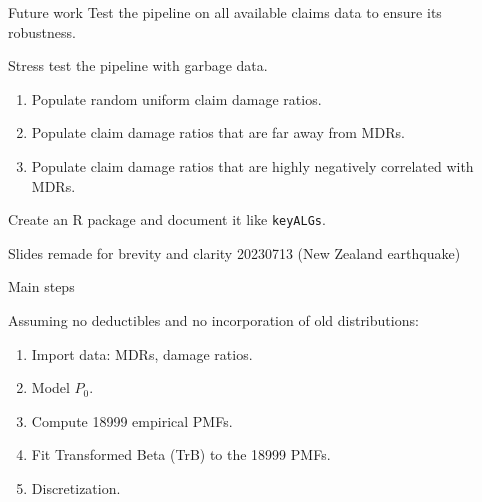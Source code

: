 \documentclass[aspectratio=169]{beamer}
\begin{document}
\begin{frame}{Future work}
Test the pipeline on all available claims data to ensure its robustness.\medskip

Stress test the pipeline with garbage data.\medskip

\begin{enumerate}
\item Populate random uniform claim damage ratios.\medskip

\item Populate claim damage ratios that are far away from MDRs.\medskip

\item Populate claim damage ratios that are highly negatively correlated with MDRs.\medskip

\end{enumerate}
 

Create an R package and document it like \texttt{keyALGs}. 
\end{frame}


\begin{frame}
\Huge \centering Slides remade for brevity and clarity 20230713 (New Zealand earthquake)
\end{frame}


\begin{frame}{Main steps}

Assuming no deductibles and no incorporation of old distributions:\medskip

\begin{enumerate}
\item Import data: MDRs, damage ratios.\medskip

\item Model $P_0$.\medskip

\item Compute 18999 empirical PMFs.\medskip

\item Fit Transformed Beta (TrB) to the 18999 PMFs.\medskip

\item Discretization.
\end{enumerate}
\end{frame}
\end{document}
